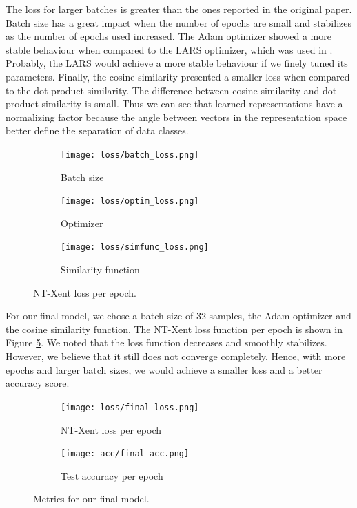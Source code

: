 \documentclass{article}
\begin{document}
The loss for larger batches is greater than the ones reported in the original paper. Batch size has a great impact when the number of epochs are small and stabilizes as the number of epochs used increased. The Adam optimizer showed a more stable behaviour when compared to the LARS optimizer, which was used in \cite{simclr}. Probably, the LARS would achieve a more stable behaviour if we finely tuned its parameters. Finally, the cosine similarity presented a smaller loss when compared to the dot product similarity. The difference between cosine similarity and dot product similarity is small. Thus we can see that learned representations have a normalizing factor because the angle between vectors in the representation space better define the separation of data classes.  

\begin{figure}
  \begin{subfigure}[t]{0.33\textwidth}
    \centering
    \texttt{[image: loss/batch\_loss.png]}
    \caption{Batch size}
    \label{fig:batch_loss}
  \end{subfigure}
  \begin{subfigure}[t]{0.33\textwidth}
    \centering
    \texttt{[image: loss/optim\_loss.png]}
    \caption{Optimizer}
    \label{fig:optim_loss}
  \end{subfigure}
  \begin{subfigure}[t]{0.33\textwidth}
    \centering
    \texttt{[image: loss/simfunc\_loss.png]}
    \caption{Similarity function}
    \label{fig:simfunc_loss}
  \end{subfigure}
  \caption{NT-Xent loss per epoch.}
  \label{fig:exp_loss}
\end{figure}

For our final model, we chose a batch size of 32 samples, the Adam optimizer and the cosine similarity function. The NT-Xent loss function per epoch is shown in Figure \ref{fig:final_loss}. We noted that the loss function decreases and smoothly stabilizes. However, we believe that it still does not converge completely. Hence, with more epochs and larger batch sizes, we would achieve a smaller loss and a better accuracy score.

\begin{figure}
  \begin{subfigure}[t]{0.49\textwidth}
    \centering
    \texttt{[image: loss/final\_loss.png]}
    \caption{NT-Xent loss per epoch}
    \label{fig:final_loss}
  \end{subfigure}
  \begin{subfigure}[t]{0.49\textwidth}
    \centering
    \texttt{[image: acc/final\_acc.png]}
    \caption{Test accuracy per epoch}
    \label{fig:final_acc}
  \end{subfigure}
  \caption{Metrics for our final model.}
  \label{fig:final_model}
\end{figure}
\end{document}
